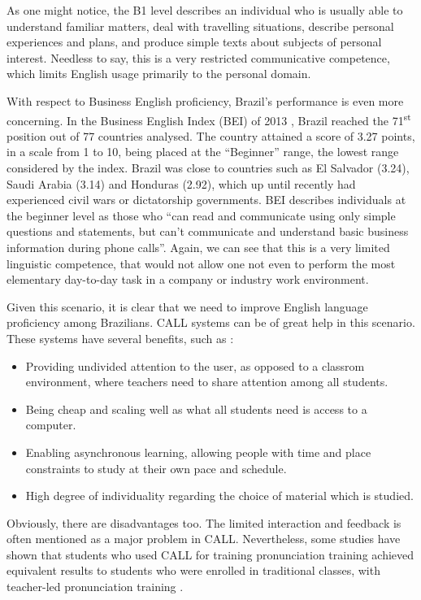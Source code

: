 As one might notice, the B1 level describes an individual who is usually able to understand familiar matters, deal with travelling situations, describe personal experiences and plans, and produce simple texts about subjects of personal interest. Needless to say, this is a very restricted communicative competence, which limits English usage primarily to the personal domain. 

With respect to Business English proficiency, Brazil's performance is even more concerning. In the 
Business English Index (BEI) of 2013 \cite{BEI2013}, Brazil reached the 71\textsuperscript{st} position out of 77 countries analysed. The country attained a score of 3.27 points, in a scale from 1 to 10, being placed at the ``Beginner'' range, the lowest range considered by the index. Brazil was close to countries such as El Salvador (3.24), Saudi Arabia (3.14) and Honduras (2.92), which up until recently had experienced civil wars or dictatorship governments. BEI describes individuals at the beginner level as those who ``can read and communicate using only simple questions and statements, but can't communicate and understand basic business information during phone calls''. Again, we can see that this is a very limited linguistic competence, that would not allow one not even to perform the most elementary day-to-day task in a company or industry work environment. 

Given this scenario, it is clear that we  need to improve English language proficiency among Brazilians. 
\ac{CALL} systems can be of great help in this scenario. These systems have several benefits, such as \cite{Witt1999}: 

\begin{itemize}
 \item Providing undivided attention to the user, as opposed to a classrom environment, where teachers need to share attention among all students.
 \item Being cheap and scaling well as what all students need is access to a computer.
 \item Enabling asynchronous learning, allowing people with time and place constraints to study at their own pace and schedule.
 \item High degree of individuality regarding the choice of material which is studied.
\end{itemize}

Obviously, there are disadvantages too. The limited interaction and feedback is often mentioned as a major problem in \ac{CALL}. Nevertheless, some studies have shown that students who used \ac{CALL} for training pronunciation training achieved equivalent results to students who were enrolled in traditional classes, with teacher-led pronunciation training \cite{Neri2008, Stenson2013}.

